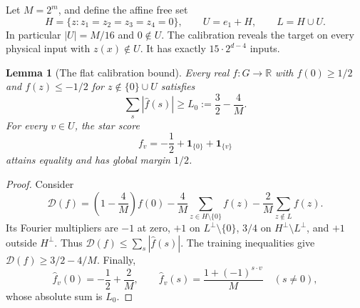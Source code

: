 \documentclass[11pt]{article}
\newtheorem{lemma}[theorem]{Lemma}
\newcommand{\R}{\mathbb R}
\newcommand{\one}{\mathbf 1}
\begin{document}
Let $M=2^m$, and define the affine free set
\begin{equation}\label{eq:freecoset}
 H=\{z:z_1=z_2=z_3=z_4=0\},\qquad
 U=e_1+H,\qquad L=H\cup U.
\end{equation}
In particular $|U|=M/16$ and $0\notin U$. The calibration reveals
the target on every physical input with $z(x)\notin U$. It has
exactly $15\cdot2^{d-4}$ inputs.

\begin{lemma}[The flat calibration bound]\label{lem:flat}
Every real $f:G\to\R$ with
$f(0)\ge1/2$ and $f(z)\le-1/2$ for
$z\notin\{0\}\cup U$ satisfies
\begin{equation}\label{eq:flatlower}
 \sum_s|\widehat f(s)|\ge L_0:=\frac32-\frac4M.
\end{equation}
For every $v\in U$, the star score
\begin{equation}\label{eq:starscore}
 f_v=-\frac12+\one_{\{0\}}+\one_{\{v\}}
\end{equation}
attains equality and has global margin $1/2$.
\end{lemma}
\begin{proof}
Consider
\[
 \mathcal D(f)=\left(1-\frac4M\right)f(0)
  -\frac4M\sum_{z\in H\setminus\{0\}}f(z)
  -\frac2M\sum_{z\notin L}f(z).
\]
Its Fourier multipliers are $-1$ at zero, $+1$ on
$L^\perp\setminus\{0\}$, $3/4$ on
$H^\perp\setminus L^\perp$, and $+1$ outside $H^\perp$.
Thus $\mathcal D(f)\le\sum_s|\widehat f(s)|$. The training inequalities
give $\mathcal D(f)\ge3/2-4/M$. Finally,
\[
 \widehat f_v(0)=-\frac12+\frac2M,
 \qquad
 \widehat f_v(s)=\frac{1+(-1)^{s\cdot v}}M\quad(s\ne0),
\]
whose absolute sum is $L_0$.
\end{proof}
\end{document}
